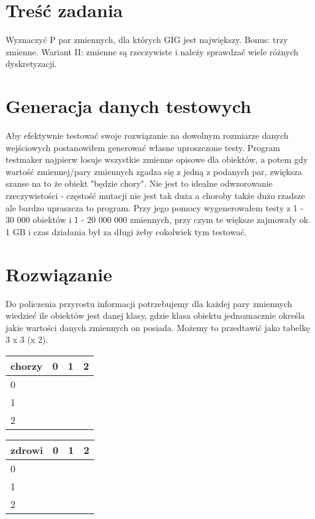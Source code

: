 \documentclass[a4paper]{article}
\begin{document}
    \section{Treść zadania}
    Wyznaczyć P par zmiennych, dla których GIG jest największy. Bonus: trzy zmienne. Wariant II: zmienne są rzeczywiste i należy sprawdzać wiele różnych dyskretyzacji.
    \section{Generacja danych testowych}
    Aby efektywnie testować swoje rozwiązanie na dowolnym rozmiarze danych wejściowych postanowiłem generować własne uproszczone testy. Program testmaker najpierw losuje wszystkie zmienne opisowe dla obiektów, a potem gdy wartość zmiennej/pary zmiennych zgadza się z jedną z podanych par, zwiększa szanse na to że obiekt "będzie chory". Nie jest to idealne odwzorowanie rzeczywistości - częstość mutacji nie jest tak duża a choroby także dużo rzadsze ale bardzo upraszcza to program.
    Przy jego pomocy wygenerowałem testy z 1 - 30 000 obiektów i 1 - 20 000 000 zmiennych, przy czym te większe zajmowały ok. 1 GB i czas działania był za długi żeby cokolwiek tym testować.
    \section{Rozwiązanie}
    Do policzenia przyrostu informacji potrzebujemy dla każdej pary zmiennych wiedzieć ile obiektów jest danej klasy, gdzie klasa obiektu jednoznacznie określa jakie wartości danych zmiennych on posiada. Możemy to przedtawić jako tabelkę 3 x 3 (x 2).

    \begin{tabular}{|l|r|r|r|}
        \hline
        chorzy & 0 & 1 & 2 \\
        \hline
        0 & & & \\
        \hline
        1 & & & \\
        \hline
        2 & & & \\
        \hline
    \end{tabular}
    \begin{tabular}{|l|r|r|r|}
        \hline
        zdrowi & 0 & 1 & 2 \\
        \hline
        0 & & & \\
        \hline
        1 & & & \\
        \hline
        2 & & & \\
        \hline
    \end{tabular}
\end{document}
